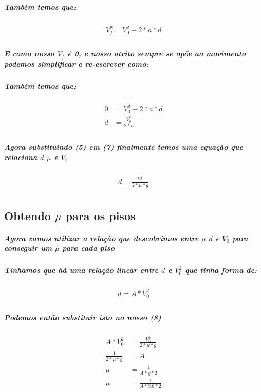 \documentclass[12pt,twoside, a4paper, twocolumn]{article}
\begin{document}
\subparagraph*{Também temos que:}

\begin{equation}
    \begin{aligned}
        V_f^2 = V_0^2 + 2*a*d \\
    \end{aligned}
\end{equation}

\subparagraph*{E como nosso $V_f$ é 0, e nosso atrito sempre se opõe ao movimento podemos simplificar e re-escrever como:}

\subparagraph*{Também temos que:}

\begin{equation}
    \begin{aligned}
        0 & = V_0^2 - 2*a*d     \\
        d & = \frac{V_0^2}{2*a} \\
    \end{aligned}
\end{equation}

\subparagraph*{Agora substituindo (5) em (7) finalmente temos uma equação que relaciona $d$ $\mu$ e $V_i$}

\begin{equation}
    \begin{aligned}
        d  = \frac{V_0^2}{2*\mu*g} \\
    \end{aligned}
\end{equation}

\subsection{Obtendo $\mu$ para os pisos}

\subparagraph*{Agora vamos utilizar a relação que descobrimos entre $\mu$ $d$ e $V_0$ para conseguir um $\mu$ para cada piso}

\subparagraph*{Tínhamos que há uma relação linear entre $d$ e $V_0^2$ que tinha forma de:}

\begin{equation}
    \begin{aligned}
        d = A * V_0^2 \\
    \end{aligned}
\end{equation}

\subparagraph*{Podemos então substituir isto no nosso (8)}

\begin{equation}
    \begin{aligned}
        A * V_0^2         & = \frac{V_0^2}{2*\mu*g} \\
        \frac{1}{2*\mu*g} & = A                     \\
        \mu               & = \frac{1}{A*g*2}       \\
        \mu               & = \frac{1}{A*9.8*2}     \\
    \end{aligned}
\end{equation}
\end{document}
